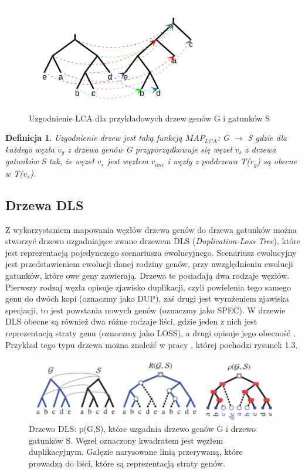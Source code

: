 \documentclass[licencjacka]{pracamgr}
\newtheorem{defi}{Definicja}[section]
\begin{document}
\begin{figure}[H]
  \centering
  \includegraphics[width=80mm]{./pictures/mapping.png}
  \caption{Uzgodnienie LCA dla przykładowych drzew genów G i gatunków S}
\end{figure}

\begin{defi}
Uzgodnienie drzew jest taką funkcją $MAP_{LCA}$: G $\rightarrow$ S gdzie dla każdego węzła $v_g$ z drzewa genów G przyporządkowuje się węzeł $v_s$ z drzewa gatunków S tak, że węzeł $v_s$ jest węzłem $v_{anc}$ i węzły z poddrzewa T($v_g$) są obecne w T($v_s$).
\end{defi}


\subsection{Drzewa DLS}

Z wykorzystaniem mapowania węzłów drzewa genów do drzewa gatunków można stworzyć drzewo uzgadniające zwane drzewem DLS (\textit{Duplication-Loss Tree}), które jest reprezentacją pojedynczego scenariusza ewolucyjnego. Scenariusz ewolucyjny jest przedstawieniem ewolucji danej rodziny genów, przy uwzględnieniu ewolucji gatunków, które owe geny zawierają. Drzewa te posiadają dwa rodzaje węzłów. Pierwszy rodzaj węzła opisuje zjawisko duplikacji, czyli powielenia tego samego genu do dwóch kopi (oznaczmy jako DUP), zaś drugi jest wyrażeniem zjawiska specjacji, to jest powstania nowych genów (oznaczmy jako SPEC). W drzewie DLS obecne są również dwa różne rodzaje liści, gdzie jeden z nich jest reprezentacją straty genu (oznaczmy jako LOSS), a drugi opisuje jego obecność \cite{doktorat_paszek}. Przykład tego typu drzewa można znaleźć w pracy \cite{dls} , której pochodzi rysunek 1.3.


\begin{figure}[H]
  \centering
  \includegraphics[width=120mm]{./pictures/DLS.png}
  \caption{Drzewo DLS: p(G,S), które uzgadnia drzewo genów G i drzewo gatunków S. Węzeł oznaczony kwadratem jest węzłem duplikacyjnym. Gałęzie narysowane linią przerywaną, które prowadzą do liści, które są reprezentacją straty genów.}
\end{figure}
\end{document}
